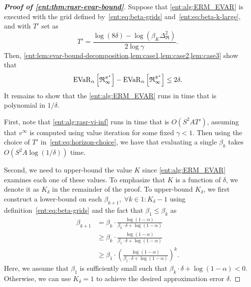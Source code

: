 \documentclass[twoside]{article}
\newcommand{\opt}{^\star}
\newcommand{\vspan}{\Delta_{\mathfrak{R}}}
\newcommand{\evar}[2]{\operatorname{EVaR}_{#1} \left[#2\right]}
\theoremstyle{plain}
\theoremstyle{definition}
\theoremstyle{remark}
\begin{document}
\begin{proof}[\textbf{Proof of \cref{ent:thm:rasr-evar-bound}}]
Suppose that \cref{ent:alg:ERM_EVAR} is executed with the grid defined by~\eqref{ent:eq:beta-grids} and~\eqref{ent:eq:beta-k-large}, and with $T'$ set as
%
\begin{equation}\label{ent:eq:horizon-choice}
 T' = \frac{\log(8\delta) - \log(\beta_{K} \vspan^2)}{2 \log \gamma}.   
\end{equation}
Then, \cref{ent:lem:evar-bound-decomposition,lem:case1,lem:case2,lem:case3} show that 
\[
 \evar{\alpha}{\mathfrak{R}_{\infty}^{\pi\opt}} - \evar{\alpha}{\mathfrak{R}_{\infty}^{\api}} \le 2\delta. 
\]
It remains to show that the \cref{ent:alg:ERM_EVAR} runs in time that is polynomial in $1/\delta$. 

First, note that \cref{ent:alg:rasr-vi-inf} runs in time that is $O(S^2 A T')$, assuming that $v^{\infty}$ is computed using value iteration for some fixed $\gamma < 1$. Then using the choice of $T'$ in~\eqref{ent:eq:horizon-choice}, we have that evaluating a single $\beta_k$ takes $O(S^2 A \log (1/\delta))$ time.

Second, we need to upper-bound the value $K$ since \cref{ent:alg:ERM_EVAR} examines each one of these values. To emphasize that $K$ is a function of $\delta$, we denote it as $K_{\delta}$ in the remainder of the proof. To upper-bound $K_{\delta}$, we first construct a lower-bound on each $\beta_{k+1},\;\forall k\in 1{:}K_{\delta}{-}1$ using definition~\eqref{ent:eq:beta-grids} and the fact that $\beta_1 \le \beta_k$ as 
%
\begin{equation} \label{ent:eq:beta-k-lowerbound}
\begin{aligned}
  \beta_{k+1}
  &= \beta_k \cdot \frac{\log (1-\alpha)}{ \beta_k\cdot \delta + \log (1-\alpha) } \\
  &\ge \beta_k \cdot \frac{\log (1-\alpha)}{ \beta_1\cdot \delta + \log (1-\alpha) } \\
  &\ge \beta_1 \cdot \left(  \frac{\log (1-\alpha)}{ \beta_1\cdot \delta + \log (1-\alpha) } \right)^{k}.
\end{aligned}
\end{equation}
%
Here, we assume that $\beta_1$ is sufficiently small such that $\beta_k \cdot \delta + \log (1-\alpha) < 0$. Otherwise, we can use $K_{\delta}=1$ to achieve the desired approximation error $\delta$. 


\end{proof}
\end{document}
